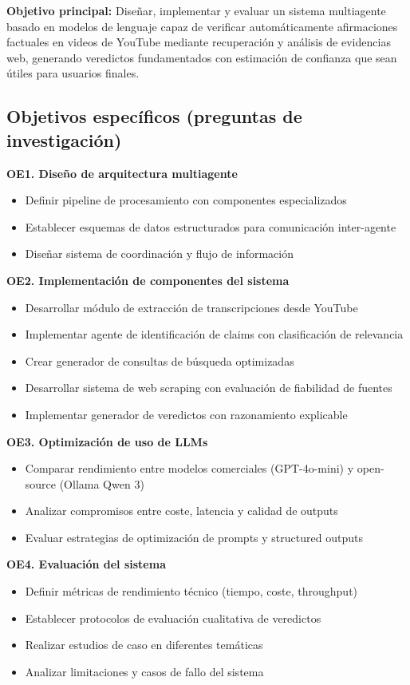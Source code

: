 \documentclass[12pt,a4paper]{article}
\begin{document}
\textbf{Objetivo principal:} Diseñar, implementar y evaluar un sistema multiagente basado en modelos de lenguaje capaz de verificar automáticamente afirmaciones factuales en videos de YouTube mediante recuperación y análisis de evidencias web, generando veredictos fundamentados con estimación de confianza que sean útiles para usuarios finales.

\subsection{Objetivos específicos (preguntas de investigación)}

\textbf{OE1. Diseño de arquitectura multiagente}
\begin{itemize}
    \item Definir pipeline de procesamiento con componentes especializados
    \item Establecer esquemas de datos estructurados para comunicación inter-agente
    \item Diseñar sistema de coordinación y flujo de información
\end{itemize}

\textbf{OE2. Implementación de componentes del sistema}
\begin{itemize}
    \item Desarrollar módulo de extracción de transcripciones desde YouTube
    \item Implementar agente de identificación de claims con clasificación de relevancia
    \item Crear generador de consultas de búsqueda optimizadas
    \item Desarrollar sistema de web scraping con evaluación de fiabilidad de fuentes
    \item Implementar generador de veredictos con razonamiento explicable
\end{itemize}

\textbf{OE3. Optimización de uso de LLMs}
\begin{itemize}
    \item Comparar rendimiento entre modelos comerciales (GPT-4o-mini) y open-source (Ollama Qwen 3)
    \item Analizar compromisos entre coste, latencia y calidad de outputs
    \item Evaluar estrategias de optimización de prompts y structured outputs
\end{itemize}

\textbf{OE4. Evaluación del sistema}
\begin{itemize}
    \item Definir métricas de rendimiento técnico (tiempo, coste, throughput)
    \item Establecer protocolos de evaluación cualitativa de veredictos
    \item Realizar estudios de caso en diferentes temáticas
    \item Analizar limitaciones y casos de fallo del sistema
\end{itemize}
\end{document}
